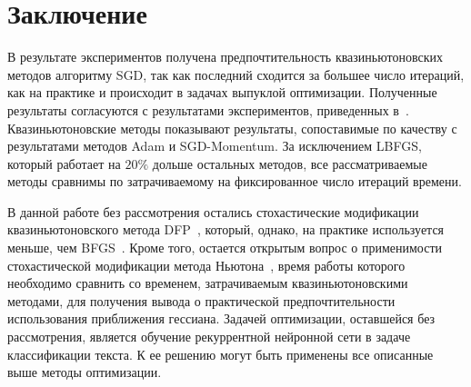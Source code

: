 \documentclass[preprint,12pt]{elsarticle}
\begin{document}
\section{Заключение}
\label{S:4}
В результате экспериментов получена предпочтительность квазиньютоновских методов алгоритму SGD, так как последний сходится за большее число итераций, как на практике и происходит в задачах выпуклой оптимизации. Полученные результаты согласуются с результатами экспериментов, приведенных в~\cite{multibatchLBFGS, BB-DL}.
Квазиньютоновские методы показывают результаты, сопоставимые по качеству с результатами методов Adam и SGD-Momentum.
За исключением LBFGS, который работает на $20\%$ дольше остальных методов, все рассматриваемые методы сравнимы по затрачиваемому на фиксированное число итераций времени.

В данной работе без рассмотрения остались стохастические модификации квазиньютоновского метода DFP~\cite{DFPorig}, который, однако, на практике используется меньше, чем BFGS~\cite{numopt}. %
Кроме того, остается открытым вопрос о применимости стохастической модификации метода Ньютона~\cite{numopt}, время работы которого необходимо сравнить со временем, затрачиваемым квазиньютоновскими методами, для получения вывода о практической предпочтительности использования приближения гессиана. 
Задачей оптимизации, оставшейся без рассмотрения, является обучение рекуррентной нейронной сети в задаче классификации текста.
К ее решению могут быть применены все описанные выше методы оптимизации.




\end{document}
